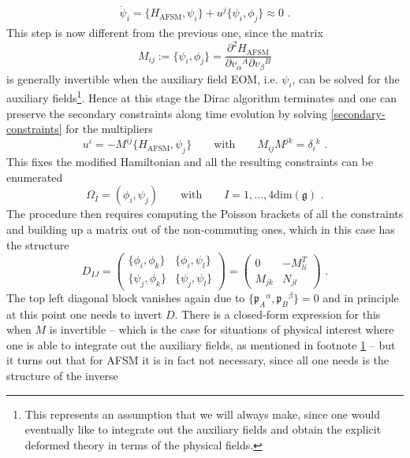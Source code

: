 \documentclass[12pt]{article}
\numberwithin{equation}{section}
\begin{document}
\begin{equation}\label{secondary-constraints}
\begin{aligned}
\dot\psi_{i} =\{H_{\text{AFSM}},\psi_{i}\}+u^{j}\{\psi_{i},\phi_{j}\} \approx 0 \,\, .
\end{aligned}
\end{equation}
This step is now different from the previous one, since the matrix
\begin{equation}
M_{ij}:=\{\psi_{i},\phi_{j}\}=\frac{\partial^2H_{\text{AFSM}}}{\partial v_{\alpha}{}^{A}\partial v_{\beta}{}^{B}}
\end{equation}
is generally invertible when the auxiliary field EOM, i.e. $\psi_{i}$, can be solved for the auxiliary fields\footnote{\label{footnote:M-invertibiliy}This represents an assumption that we will always make, since one would eventually like to integrate out the auxiliary fields and obtain the explicit deformed theory in terms of the physical fields.}. Hence at this stage the Dirac algorithm terminates and one can preserve the secondary constraints along time evolution by solving \eqref{secondary-constraints} for the multipliers
\begin{equation}
u^{i}=-M^{ij}\{H_{\text{AFSM}},\psi_{j}\}
\qquad \text{with} \qquad
M_{ij}M^{jk}=\delta_{i}{}^{k} \,\, .
\end{equation}
This fixes the modified Hamiltonian and all the resulting constraints can be enumerated
\begin{equation}
\Omega_{I}=(\phi_{i},\psi_{j})
\qquad \text{with} \qquad 
I=1,...,4\text{dim}(\mathfrak{g}) \,\, .
\end{equation}
The procedure then requires computing the Poisson brackets of all the constraints and building up a matrix out of the non-commuting ones, which in this case has the structure
\begin{equation}
D_{IJ}=
\begin{pmatrix}
\{\phi_{i},\phi_{k}\} & \{\phi_{i},\psi_{l}\} \\
\{ \psi_{j},\phi_{k} \} &  \{ \psi_{j},\psi_{l} \} 
\end{pmatrix}
=
\begin{pmatrix}
0 & -M_{li}^{T} \\
M_{jk} &  N_{jl} 
\end{pmatrix}
\,\, .
\end{equation}
The top left diagonal block vanishes again due to $\{\mathfrak{p}_{A}{}^{\alpha},\mathfrak{p}_{B}{}^{\beta}\}=0$ and in principle at this point one needs to invert $D$. There is a closed-form expression for this when $M$ is invertible -- which is the case for situations of physical interest where one is able to integrate out the auxiliary fields, as mentioned in footnote \ref{footnote:M-invertibiliy} -- but it turns out that for AFSM it is in fact not necessary, since all one needs is the structure of the inverse
\end{document}
